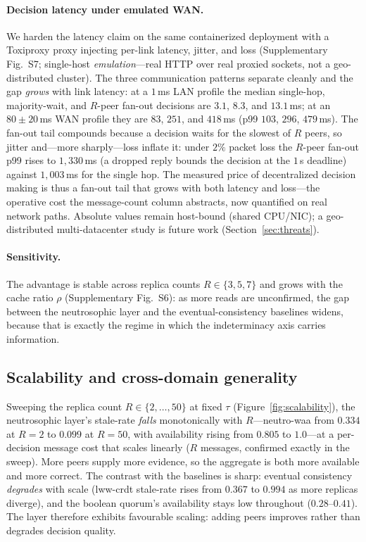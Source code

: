 \documentclass[fleqn,10pt]{wlscirep}
\begin{document}
\paragraph{Decision latency under emulated WAN.} We harden the latency claim on the same containerized
deployment with a Toxiproxy proxy injecting per-link latency, jitter, and loss
(Supplementary Fig.~S7; single-host \emph{emulation}---real HTTP over real proxied sockets, not a
geo-distributed cluster). The three communication patterns separate cleanly and the gap \emph{grows}
with link latency: at a $1$\,ms LAN profile the median single-hop, majority-wait, and $R$-peer fan-out
decisions are $3.1$, $8.3$, and $13.1$\,ms; at an $80\pm20$\,ms WAN profile they are $83$, $251$, and
$418$\,ms (p99 $103$, $296$, $479$\,ms). The fan-out tail compounds because a decision waits for the
slowest of $R$ peers, so jitter and---more sharply---loss inflate it: under $2\%$ packet loss the
$R$-peer fan-out p99 rises to $1{,}330$\,ms (a dropped reply bounds the decision at the $1$\,s deadline)
against $1{,}003$\,ms for the single hop. The measured price of decentralized decision making is thus a
fan-out tail that grows with both latency and loss---the operative cost the message-count column
abstracts, now quantified on real network paths. Absolute values remain host-bound (shared CPU/NIC); a
geo-distributed multi-datacenter study is future work (Section~\ref{sec:threats}).

\paragraph{Sensitivity.} The advantage is stable across replica counts $R\in\{3,5,7\}$ and grows with
the cache ratio $\rho$ (Supplementary Fig.~S6): as more reads are unconfirmed, the gap between
the neutrosophic layer and the eventual-consistency baselines widens, because that is exactly the
regime in which the indeterminacy axis carries information.

\subsection{Scalability and cross-domain generality}
Sweeping the replica count $R\in\{2,\dots,50\}$ at fixed
$\tau$ (Figure~\ref{fig:scalability}), the neutrosophic layer's stale-rate \emph{falls} monotonically
with $R$---neutro-waa from $0.334$ at $R{=}2$ to $0.099$ at $R{=}50$, with availability rising from
$0.805$ to $1.0$---at a per-decision message cost that scales linearly ($R$ messages, confirmed exactly
in the sweep). More peers supply more evidence, so the aggregate is both more available and more correct.
The contrast with the baselines is sharp: eventual consistency \emph{degrades} with scale (lww-crdt
stale-rate rises from $0.367$ to $0.994$ as more replicas diverge), and the boolean quorum's availability
stays low throughout ($0.28$--$0.41$). The layer therefore exhibits favourable scaling: adding peers improves rather than degrades decision
quality.
\end{document}
